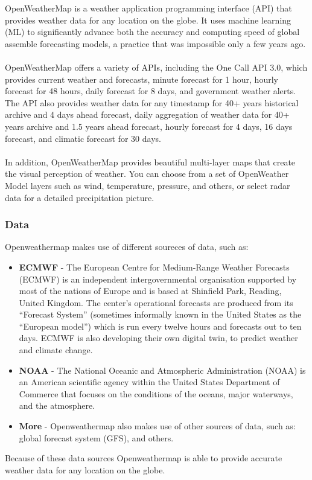 \documentclass[../paper.tex]{subfiles}
\begin{document}
    OpenWeatherMap is a weather application programming interface (API) that provides weather data for any location on the globe.
    It uses machine learning (ML) to significantly advance both the accuracy and computing speed of global assemble forecasting models, a practice that was impossible only a few years ago\cite{b1}.
    \\\\
    OpenWeatherMap offers a variety of APIs, including the One Call API 3.0, which provides current weather and forecasts, minute forecast for 1 hour, hourly forecast for 48 hours, daily forecast for 8 days, and government weather alerts\cite{b1}.
    The API also provides weather data for any timestamp for 40+ years historical archive and 4 days ahead forecast, daily aggregation of weather data for 40+ years archive and 1.5 years ahead forecast, hourly forecast for 4 days, 16 days forecast, and climatic forecast for 30 days\cite{b1}.
    \\\\
    In addition, OpenWeatherMap provides beautiful multi-layer maps that create the visual perception of weather.
    You can choose from a set of OpenWeather Model layers such as wind, temperature, pressure, and others, or select radar data for a detailed precipitation picture\cite{b1}.

    \subsubsection{Data}
    Openweathermap makes use of different soureces of data, such as:
    \begin{itemize}
        \item \textbf{ECMWF} - The European Centre for Medium-Range Weather Forecasts (ECMWF) is an independent intergovernmental organisation supported by most of the nations of Europe and is based at Shinfield Park, Reading, United Kingdom.
         The center's operational forecasts are produced from its ``Forecast System'' (sometimes informally known in the United States as the ``European model'') which is run every twelve hours and forecasts out to ten days\cite{b4}.
         ECMWF is also developing their own digital twin, to predict weather and climate change\cite{b5}.
        \item \textbf{NOAA} - The National Oceanic and Atmospheric Administration (NOAA) is an American scientific agency within the United States Department of Commerce that focuses on the conditions of the oceans, major waterways, and the atmosphere\cite{b6}.
        \item \textbf{More} - Openweathermap also makes use of other sources of data, such as: global forecast system (GFS), and others\cite{b2}.
    \end{itemize}
    Because of these data sources Openweathermap is able to provide accurate weather data for any location on the globe.
\end{document}
